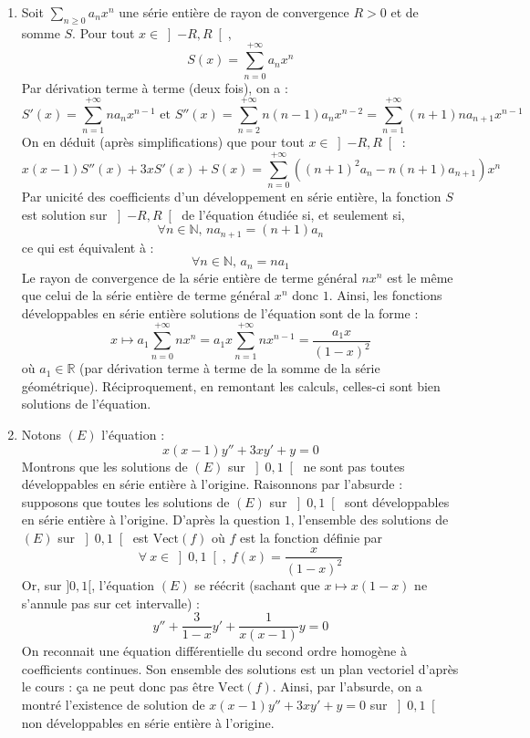 \documentclass[a4paper,10pt]{report}
\newcommand{\Sum}[2]{\ensuremath{\textstyle{\sum\limits_{#1}^{#2}}}}
\begin{document}
\corr 
\begin{enumerate}
\item Soit $\displaystyle \Sum{n \geq 0}{} a_n x^n$ une série entière de rayon de convergence $R > 0$ et de somme $S$. Pour tout $x \in \left] { - R,R} \right[$,
$$S(x) = \displaystyle\sum\limits_{n = 0}^{ + \infty } {a_n x^n } $$
Par dérivation terme à terme (deux fois), on a :
$$ S'(x) = \displaystyle\sum\limits_{n = 1}^{ + \infty } {na_n x^{n - 1} } \text{ et }S''(x) = \displaystyle\sum\limits_{n = 2}^{ + \infty } {n(n - 1)a_n x^{n - 2} }  = \displaystyle\sum\limits_{n = 1}^{ + \infty } {(n + 1)na_{n + 1} x^{n - 1} } $$
On en déduit (après simplifications) que pour tout $x \in \left] { - R,R} \right[$ :
$$ x(x - 1)S''(x) + 3xS'(x) + S(x) = \displaystyle\sum\limits_{n = 0}^{ + \infty } {\left( {(n + 1)^2 a_n  - n(n + 1)a_{n + 1} } \right)x^n } $$
Par unicité des coefficients d'un développement en série entière, la fonction $S$ est solution sur $\left] { - R,R} \right[$ de l'équation étudiée si, et seulement si, 
$$\forall n \in \mathbb{N}, \, na_{n + 1}  = (n + 1)a_n $$
ce qui est équivalent à :
$$\forall n \in \mathbb{N}, \, a_n  = na_1 $$
Le rayon de convergence de la série entière de terme général $nx^n$ est le même que celui de la série entière de terme général $x^n$ donc $1$. Ainsi,  les fonctions développables en série entière solutions de l'équation sont de la forme :
$$x \mapsto a_1 \displaystyle\sum\limits_{n = 0}^{ + \infty } {nx^n }  = a_1 x\displaystyle\sum\limits_{n = 1}^{ + \infty } nx^{n-1} = \dfrac{a_1 x}{(1-x)^2}$$
où $a_1 \in \mathbb{R}$ (par dérivation terme à terme de la somme de la série géométrique). Réciproquement, en remontant les calculs, celles-ci sont bien solutions de l'équation.
\item Notons $(E)$ l'équation :
$$x(x-1)y''+3xy'+y=0$$
Montrons que les solutions de $(E)$ sur $\left] 0,1\right[$ ne sont pas toutes développables en série entière à l'origine.  Raisonnons par l'absurde : supposons que toutes les solutions de $(E)$ sur $\left] 0,1\right[$ sont développables en série entière à l'origine. D'après la question $1$, l'ensemble des solutions de $(E)$ sur $\left] 0,1\right[$ est $\textrm{Vect}(f)$ où $f$ est la fonction définie par 
$$\forall\:x\in \left] 0,1\right[, \; f(x)=\dfrac{x}{(1-x)^2}$$
Or, sur $]0,1[$, l'équation $(E)$ se réécrit (sachant que $x \mapsto x(1-x)$ ne s'annule pas sur cet intervalle) :
$$ y'' + \dfrac{3}{1-x}y' + \dfrac{1}{x(x-1)} y = 0$$
On reconnait une équation différentielle du second ordre homogène à coefficients continues. Son ensemble des solutions est un plan vectoriel d'après le cours : ça ne peut donc pas être $\textrm{Vect}(f)$. Ainsi, par l'absurde, on a montré l'existence de solution de $x(x-1)y''+3xy'+y=0$ sur $\left]0,1 \right[$ non développables en série entière à l'origine.
\end{enumerate}
\end{document}
